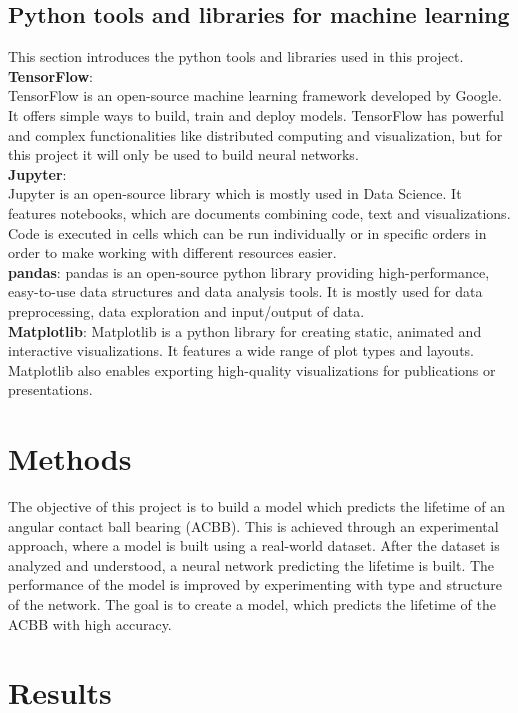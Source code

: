 \documentclass[letterpaper,10pt]{article}
\begin{document}
	\subsection{Python tools and libraries for machine learning}
	This section introduces the python tools and libraries used in this project. \\
	\textbf{TensorFlow}: \\ TensorFlow is an open-source machine learning framework developed by Google. It offers simple ways to build, train and deploy models. TensorFlow has powerful and complex functionalities like distributed computing and visualization, but for this project it will only be used to build neural networks.\cite{tensorflow2015-whitepaper} \\
	\textbf{Jupyter}: \\ Jupyter is an open-source library which is mostly used in Data Science. It features notebooks, which are documents combining code, text and visualizations. Code is executed in cells which can be run individually or in specific orders in order to make working with different resources easier.\cite{jupyter} \\
	\textbf{pandas}: pandas is an open-source python library providing high-performance, easy-to-use data structures and data analysis tools. It is mostly used for data preprocessing, data exploration and input/output of data.\cite{pandas} \\
	\textbf{Matplotlib}: Matplotlib is a python library for creating static, animated and interactive visualizations. It features a wide range of plot types and layouts. Matplotlib also enables exporting high-quality visualizations for publications or presentations.\cite{matplotlib} \\
	\newpage
	\section{Methods}
	The objective of this project is to build a model which predicts the lifetime of an angular contact ball bearing (ACBB). This is achieved through an experimental approach, where a model is built using a real-world dataset. After the dataset is analyzed and understood, a neural network predicting the lifetime is built. The performance of the model is improved by experimenting with type and structure of the network. The goal is to create a model, which predicts the lifetime of the ACBB with high accuracy.  
	\section{Results}
\end{document}
